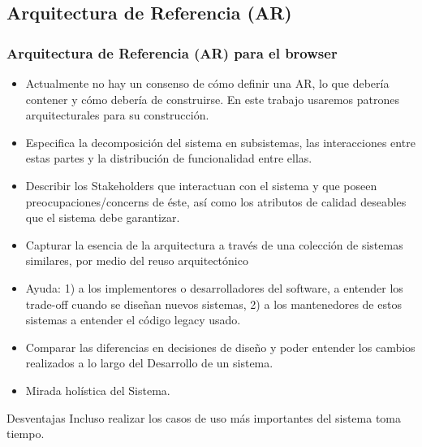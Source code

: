 \documentclass[serif,9pt]{beamer}
\begin{document}
\subsection{Arquitectura de Referencia (AR)}
\begin{frame}
	\frametitle{Arquitectura de Referencia (AR) para el browser}
		\begin{itemize}
			\item Actualmente no hay un consenso de cómo definir una AR, lo que debería contener y cómo debería de construirse. En este trabajo usaremos patrones arquitecturales para su construcción.
			\item Especifica la decomposici\'on del sistema en subsistemas, las interacciones entre estas partes y la distribuci\'on de funcionalidad entre ellas.
			\item Describir los Stakeholders que interactuan con el sistema y que poseen preocupaciones/concerns de \'este, así como los atributos de calidad deseables que el sistema debe garantizar.
			\item Capturar la esencia de la arquitectura a trav\'es de una colecci\'on de sistemas similares, por medio del reuso arquitect\'onico
			\item Ayuda: 1) a los implementores o desarrolladores del software, a entender los trade-off cuando se diseñan nuevos sistemas, 2) a los mantenedores de estos sistemas a entender el c\'odigo legacy usado.
			\item Comparar las diferencias en decisiones de diseño y poder entender los cambios realizados a lo largo del Desarrollo de un sistema.
			\item Mirada hol\'istica del Sistema.
		\end{itemize}
	\begin{block}{Desventajas}
		Incluso realizar los casos de uso más importantes del sistema toma tiempo.
	\end{block}
\end{frame}
\end{document}
